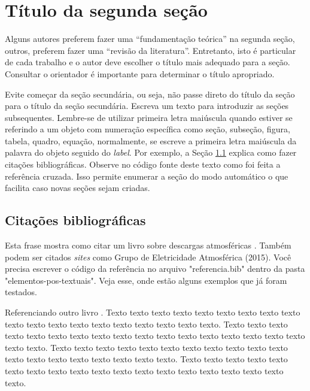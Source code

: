 \chapter{Título da segunda seção}
\label{cap:fundamentacao-teorica}

Alguns autores preferem fazer uma ``fundamentação teórica'' na segunda seção, outros, preferem fazer uma ``revisão da literatura''. Entretanto, isto é particular de cada trabalho e o autor deve escolher o título mais adequado para a seção. Consultar o orientador é importante para determinar o título apropriado.

Evite começar da seção secundária, ou seja, não passe direto do título da seção para o título da seção secundária. Escreva um texto para introduzir as seções subsequentes. Lembre-se de utilizar primeira letra maiúscula quando estiver se referindo a um objeto com numeração específica como seção, subseção, figura, tabela, quadro, equação, normalmente, se escreve a primeira letra maiúscula da palavra do objeto seguido do \textit{label}. Por exemplo, a Seção \ref{sec:citacoes} explica como fazer citações bibliográficas. Observe no código fonte deste texto como foi feita a referência cruzada. Isso permite enumerar a seção do modo automático o que facilita caso novas seções sejam criadas.  

\section{Citações bibliográficas}\label{sec:citacoes}

    Esta frase mostra como citar um livro sobre descargas atmosféricas \cite{rakov2003lightning}. Também podem ser citados \textit{sites} como \nocite{elat2015densidade}Grupo de Eletricidade Atmosférica (2015). Você precisa escrever o código da referência no arquivo "referencia.bib" dentro da pasta "elementos-pos-textuais". Veja esse, onde estão alguns exemplos que já foram testados.        

    Referenciando outro livro \cite{LangtangenLogg2017}. Texto texto texto texto texto texto texto texto texto texto texto texto texto texto texto texto texto texto texto. Texto texto texto texto texto texto texto texto texto texto texto texto texto texto texto texto texto texto texto. Texto texto texto texto texto texto texto texto texto texto texto texto texto texto texto texto texto texto texto. Texto texto texto texto texto texto texto texto texto texto texto texto texto texto texto texto texto texto texto.

